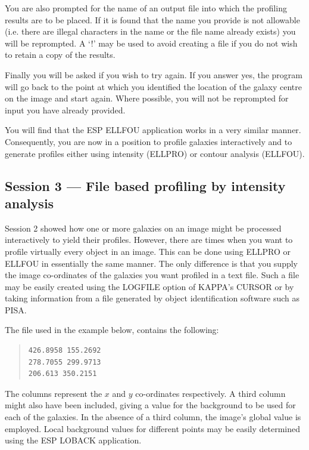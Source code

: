 \documentclass[twoside,11pt]{article}
\newcommand{\xref}[3]{#1}
\newcommand{\xlabel}[1]{}
\newenvironment{myquote}{\begin{quote}\begin{small}}{\end{small}\end{quote}}
\begin{document}
You are also prompted for the name of an output file into which the 
profiling results are to be placed. If it is found that the name you provide is
not allowable (i.e. there are illegal characters in the name or the file name
already exists) you will be reprompted. A `!' may be used to avoid creating a
file if you do not wish to retain a copy of the results.

Finally you will be asked if you wish to try again. If you answer yes, the
program will go back to the point at which you identified the location of the
galaxy centre on the image and start again. Where possible, you will not be
reprompted for input you have already provided.

You will find that the ESP ELLFOU application works in a very similar manner.
Consequently, you are now in a position to profile galaxies
interactively and to generate profiles either using intensity (ELLPRO) or 
contour analysis (ELLFOU).


\subsection{Session 3 --- File based profiling by intensity analysis}
\xlabel{SESSION3}

Session 2 showed how one or more galaxies on an image might be 
processed interactively to yield their profiles. However, there are
times when you want to profile virtually every object in an image.
This can be done using ELLPRO or ELLFOU in essentially the same manner.
The only difference is that you supply the image co-ordinates of the galaxies
you want profiled in a text file. Such a file may be easily created 
using the LOGFILE option of \xref{KAPPA}{sun95}{}'s CURSOR or by taking 
information from a file generated by object identification software such as 
\xref{PISA}{sun109}{}.
 
The file used in the example below, contains the following:

\begin{myquote}
\begin{verbatim}
426.8958 155.2692
278.7055 299.9713
206.613 350.2151
\end{verbatim}
\end{myquote}

The columns represent the $x$ and $y$ co-ordinates respectively. A third column
might also have been included, giving a value for the background to be 
used for each of the galaxies. In the absence of a third column, the image's
global value is employed. Local background values for different points may be
easily determined using the ESP LOBACK application. 
\end{document}
